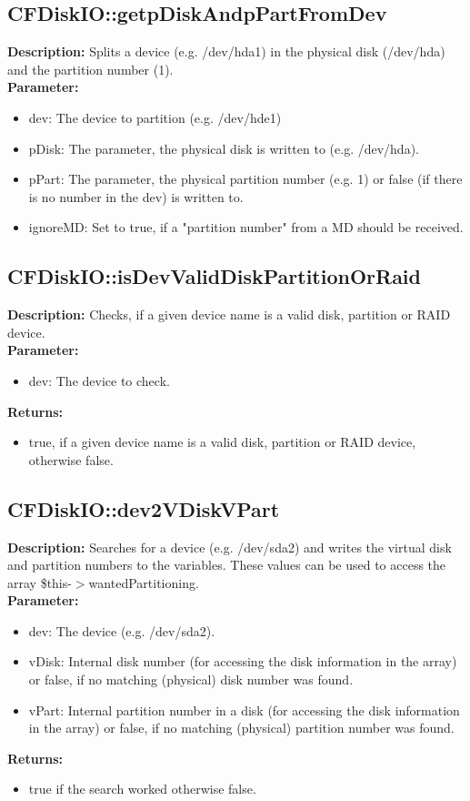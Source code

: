\subsection{CFDiskIO::getpDiskAndpPartFromDev}
\textbf{Description:} Splits a device (e.g. /dev/hda1) in the physical disk (/dev/hda) and the partition number (1).\\
\textbf{Parameter:}
\begin{itemize}
\item dev: The device to partition (e.g. /dev/hde1)
\item pDisk: The parameter, the physical disk is written to (e.g. /dev/hda).
\item pPart: The parameter, the physical partition number (e.g. 1) or false (if there is no number in the dev) is written to.
\item ignoreMD: Set to true, if a "partition number" from a MD should be received.
\end{itemize}

\subsection{CFDiskIO::isDevValidDiskPartitionOrRaid}
\textbf{Description:} Checks, if a given device name is a valid disk, partition or RAID device.\\
\textbf{Parameter:}
\begin{itemize}
\item dev: The device to check.
\end{itemize}
\textbf{Returns:}
\begin{itemize}
\item true, if a given device name is a valid disk, partition or RAID device, otherwise false.
\end{itemize}

\subsection{CFDiskIO::dev2VDiskVPart}
\textbf{Description:} Searches for a device (e.g. /dev/sda2) and writes the virtual disk and partition numbers to the variables. These values can be used to access the array \$this-$>$wantedPartitioning.\\
\textbf{Parameter:}
\begin{itemize}
\item dev: The device (e.g. /dev/sda2).
\item vDisk: Internal disk number (for accessing the disk information in the array) or false, if no matching (physical) disk number was found.
\item vPart: Internal partition number in a disk (for accessing the disk information in the array) or false, if no matching (physical) partition number was found.
\end{itemize}
\textbf{Returns:}
\begin{itemize}
\item true if the search worked otherwise false.
\end{itemize}

